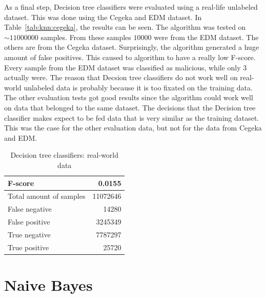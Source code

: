 \noindent As a final step, Decision tree classifiers were evaluated using a real-life unlabeled dataset. This was done using the Cegeka and EDM dataset. In Table~\ref{tab:knn:cegeka}, the results can be seen. The algorithm was tested on $\sim11000000$ samples. From these samples $10000$ were from the EDM dataset. The others are from the Cegeka dataset. Surprisingly,  the algorithm generated a huge amount of false positives. This caused to algorithm to have a really low F-score. Every sample from the EDM dataset was classified as malicious, while only $3$ actually were. The reason that Decsion tree classifiers do not work well on real-world unlabeled data is probably because it is too fixated on the training data. The other evaluation tests got good results since the algorithm could work well on data that belonged to the same dataset. The decisions that the Decision tree classifier makes expect to be fed data that is very similar as the training dataset. This was the case for the other evaluation data, but not for the data from Cegeka and EDM. 

\begin{table}[H]
\caption{Decision tree classifiers: real-world data}
\label{tab:tree:cegeka}
\centering
\begin{tabular}{l  r}
\toprule
F-score & 0.0155\\
\midrule
Total amount of samples & 11072646 \\
False negative & 14280  \\
False positive & 3245349 \\
True negative & 7787297 \\
True positive & 25720  \\
\bottomrule
\end{tabular}
\end{table}



\newpage
\section{Naive Bayes}


